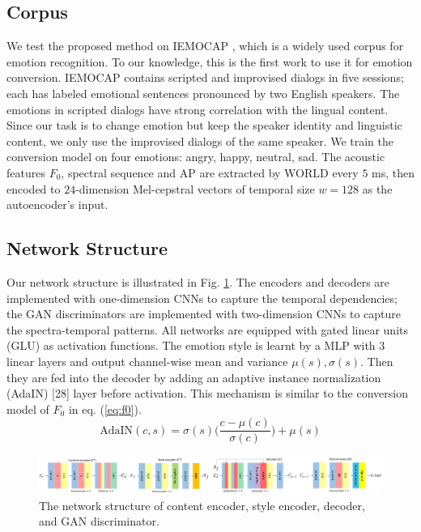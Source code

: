 \documentclass{article}
\begin{document}
\subsection{Corpus}
We test the proposed method on IEMOCAP \cite{busso2008iemocap}, which is a widely used corpus for emotion recognition. To our knowledge, this is the first work to use it for emotion conversion. IEMOCAP contains scripted and improvised dialogs in five sessions; each has labeled emotional sentences pronounced by two English speakers. The emotions in scripted dialogs have strong correlation with the lingual content. Since our task is to change emotion but keep the speaker identity and linguistic content, we only use the improvised dialogs of the same speaker. We train the conversion model on four emotions: angry, happy, neutral, sad. The acoustic features $F_0$, spectral sequence and AP are extracted by WORLD \cite{morise2016world} every $5$ ms, then encoded to $24$-dimension Mel-cepstral vectors of temporal size $w=128$ as the autoencoder's input.



\subsection{Network Structure}
Our network structure is illustrated in Fig. \ref{fig:NN}. The encoders and decoders are implemented with one-dimension CNNs to capture the temporal dependencies; the GAN discriminators are implemented with two-dimension CNNs to capture the spectra-temporal patterns. All networks are equipped with gated linear units (GLU) \cite{dauphin2017language} as activation functions. The emotion style is learnt by a MLP with 3 linear layers and output channel-wise mean and variance $\mu(s), \sigma(s)$. Then they are fed into the decoder by adding an adaptive instance normalization (AdaIN) [28] layer before activation. This mechanism is similar to the conversion model of $F_0$ in eq. (\ref{eq:f0}).
\begin{equation}
\text{AdaIN}(c,s) = \sigma(s)\Big(\frac{c-\mu(c)}{\sigma(c)}\Big) + \mu(s)
\end{equation}

\begin{figure}[t!]
\includegraphics[width=1.0\textwidth]{FIG/NN}
\caption{The network structure of content encoder, style encoder, decoder, and GAN discriminator.}
\label{fig:NN}
\end{figure}
\end{document}
